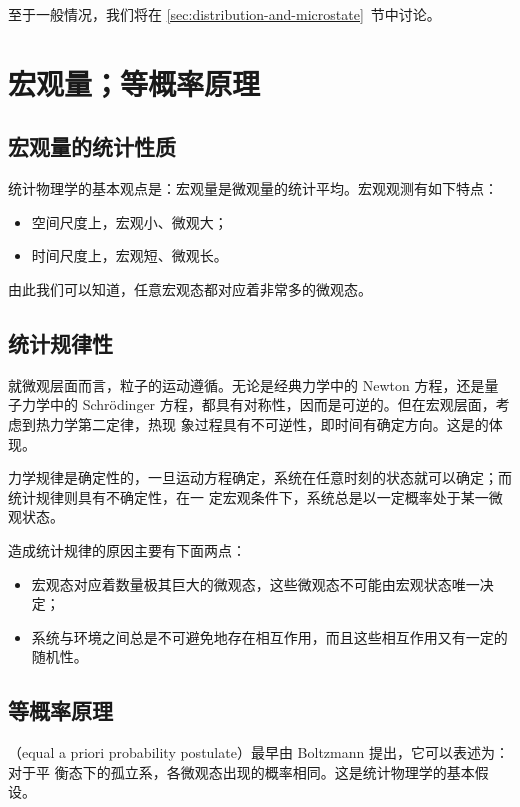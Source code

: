 至于一般情况，我们将在 \ref{sec:distribution-and-microstate}~节中讨论。

\section{宏观量；等概率原理}

\subsection{宏观量的统计性质}

统计物理学的基本观点是：宏观量是微观量的统计平均。宏观观测有如下特点：

\begin{itemize}
  \item 空间尺度上，宏观小、微观大；
  \item 时间尺度上，宏观短、微观长。
\end{itemize}

由此我们可以知道，任意宏观态都对应着非常多的微观态。

\subsection{统计规律性}

就微观层面而言，粒子的运动遵循。无论是经典力学中的 Newton 方程，还是量子力学中的
Schrödinger 方程，都具有对称性，因而是可逆的。但在宏观层面，考虑到热力学第二定律，热现
象过程具有不可逆性，即时间有确定方向。这是的体现。

力学规律是确定性的，一旦运动方程确定，系统在任意时刻的状态就可以确定；而统计规律则具有不确定性，在一
定宏观条件下，系统总是以一定概率处于某一微观状态。

造成统计规律的原因主要有下面两点：

\begin{itemize}
  \item 宏观态对应着数量极其巨大的微观态，这些微观态不可能由宏观状态唯一决定；
  \item 系统与环境之间总是不可避免地存在相互作用，而且这些相互作用又有一定的随机性。
\end{itemize}

\subsection{等概率原理}

（equal a priori probability postulate）最早由 Boltzmann 提出，它可以表述为：对于平
衡态下的孤立系，各微观态出现的概率相同。这是统计物理学的基本假设。

